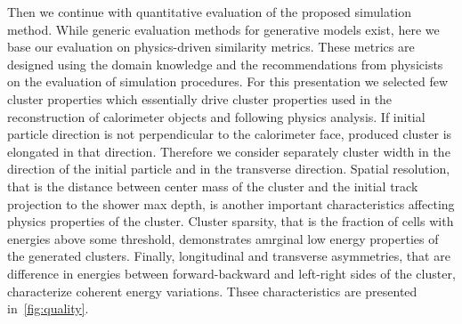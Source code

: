 Then we continue with quantitative evaluation of the proposed simulation
method. While generic evaluation methods for generative models exist,
here we base our evaluation on physics-driven similarity
metrics. These metrics are designed using the domain knowledge and the
recommendations from physicists on the evaluation of simulation
procedures. 
For this presentation we selected few cluster properties which essentially
drive cluster properties used in the reconstruction of calorimeter objects
and following physics analysis. If initial particle direction is not
perpendicular to the calorimeter face, produced cluster is elongated
in that direction. Therefore we consider separately cluster width in
the direction of the initial particle and in the transverse
direction. Spatial resolution, that is the distance between center
mass of the cluster and the initial track projection to the shower max
depth, is another important characteristics affecting physics
properties of the cluster. Cluster sparsity, that is the fraction of
cells with energies above some threshold, demonstrates amrginal low
energy properties of the generated clusters. Finally, longitudinal and
transverse asymmetries, that are difference in energies between
forward-backward and left-right sides of the cluster, characterize
coherent energy variations.  
 Thsee  characteristics are presented in~\cref{fig:quality}. 


